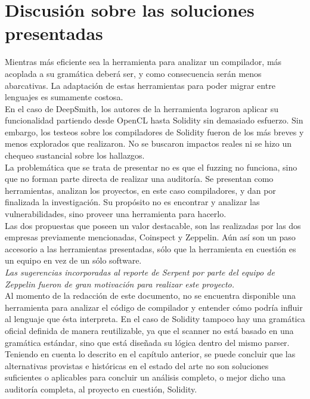 \section{Discusión sobre las soluciones presentadas}
Mientras más eficiente sea la herramienta para analizar un compilador, más acoplada a su gramática deberá ser, y como consecuencia serán menos abarcativas. La adaptación de estas herramientas para poder migrar entre lenguajes es sumamente costosa.\\

En el caso de DeepSmith, los autores de la herramienta lograron aplicar su funcionalidad partiendo desde OpenCL hasta Solidity sin demasiado esfuerzo. Sin embargo, los testeos sobre los compiladores de Solidity fueron de los más breves y menos explorados que realizaron. No se buscaron impactos reales ni se hizo un chequeo sustancial sobre los hallazgos.\\

La problemática que se trata de presentar no es que el fuzzing no funciona, sino que no forman parte directa de realizar una auditoría. Se presentan como herramientas, analizan los proyectos, en este caso compiladores, y dan por finalizada la investigación. Su propósito no es encontrar y analizar las vulnerabilidades, sino proveer una herramienta para hacerlo.\\

Las dos propuestas que poseen un valor destacable, son las realizadas por las dos empresas previamente mencionadas, Coinspect y Zeppelin. Aún así son un paso accesorio a las herramientas presentadas, sólo que la herramienta en cuestión es un equipo en vez de un sólo software.\\

\textit{Las sugerencias incorporadas al reporte de Serpent por parte del equipo de Zeppelin fueron de gran motivación para realizar este proyecto.}\\

Al momento de la redacción de este documento, no se encuentra disponible una herramienta para analizar el código de compilador y entender cómo podría influir al lenguaje que ésta interpreta. En el caso de Solidity tampoco hay una gramática oficial definida de manera reutilizable, ya que el scanner no está basado en una gramática estándar, sino que está diseñada su lógica dentro del mismo parser.
Teniendo en cuenta lo descrito en el capítulo anterior, se puede concluir que las alternativas provistas e históricas en el estado del arte no son soluciones suficientes o aplicables para concluir un análisis completo, o mejor dicho una auditoría completa, al proyecto en cuestión, Solidity.
